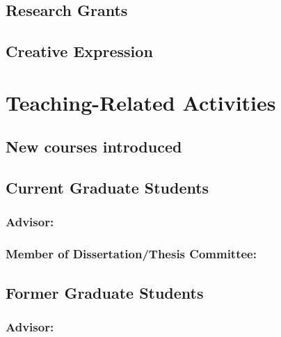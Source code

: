 \documentclass[10pt]{article}
\begin{document}
  \subsection{Research Grants}

\iftrue
  \subsection{Creative Expression}

\fi
%
%    


\iftrue
\section{Teaching-Related Activities}
  \subsection{New courses introduced}

  \subsection{Current Graduate Students}
    \subsubsection{Advisor:}
    \begin{enumerate}

    \end{enumerate}
    \subsubsection{Member of Dissertation/Thesis Committee:}
    \begin{enumerate}

    \end{enumerate}
  \subsection{Former Graduate Students}
    \subsubsection{Advisor:}
    \begin{enumerate}

    \end{enumerate}
\end{document}
